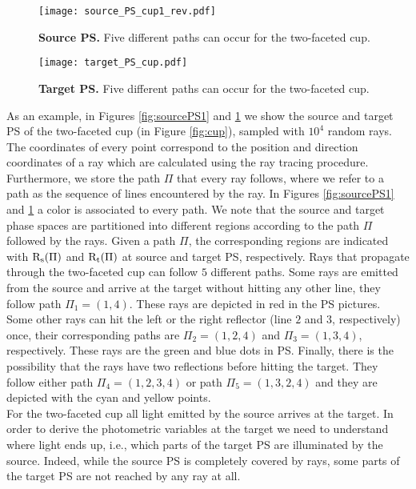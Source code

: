 \begin{figure}[t]
  \begin{minipage}[]{0.49\textwidth}
\centering
    \texttt{[image: source\_PS\_cup1\_rev.pdf]}
    \caption{\textbf{Source PS.} Five different paths can occur for the two-faceted cup.}
    \label{fig:sourcePS1}
  \end{minipage}
\hfill
  \begin{minipage}[]{0.49\textwidth}
\centering
    \texttt{[image: target\_PS\_cup.pdf]}
  \caption{\textbf{Target PS.} Five different paths can occur for the two-faceted cup.}
   \label{fig:targetPS1}
 \end{minipage}
\end{figure}
As an example, in Figures \ref{fig:sourcePS1} and \ref{fig:targetPS1} we show the source and target PS of the two-faceted cup (in Figure \ref{fig:cup}), sampled with $10^4$ random rays. The coordinates of every point correspond to the position and direction coordinates of a ray which are calculated using the ray tracing procedure. Furthermore, we store the path $\Pi$ that every ray follows, where we refer to a path as the sequence of lines encountered by the ray.
In Figures \ref{fig:sourcePS1} and \ref{fig:targetPS1} a color is associated to every path.
We note that the source and target phase spaces are partitioned into different regions according to the path $\Pi$ followed by the rays.
Given a path $\Pi$, the corresponding regions are indicated with $\mbox{$\textup{R}$}_\textrm{s}(\Pi)$ and $\mbox{$\textup{R}$}_\textrm{t}(\Pi)$ at source and target PS, respectively.
Rays that propagate through the two-faceted cup can follow $5$ different paths. Some rays are emitted from the source and arrive at the target without hitting any other line, they follow path $\Pi_1= (1,4)$. These rays are depicted in red in the PS pictures. Some other rays can hit the left or the right reflector (line $2$ and $3$, respectively) once, their corresponding paths are $\Pi_2 = (1,2,4)$ and $\Pi_3 = (1,3,4)$, respectively. These rays are the green and blue dots in PS. Finally, there is the possibility that the rays have two reflections before hitting the target. They follow either path $\Pi_4 = (1,2,3,4)$ or path $\Pi_5 = (1,3,2,4)$ and they are depicted with the cyan and yellow points.
\\ \indent For the two-faceted cup all light emitted by the source arrives at the target. In order to derive the photometric variables at the target we need to understand where light ends up, i.e., which parts of the target PS are illuminated by the source. Indeed, while the source PS is completely covered by rays, some parts of the target PS are not reached by any ray at all.

